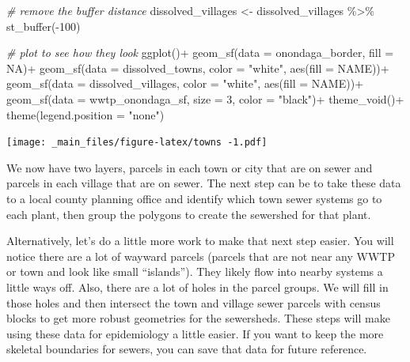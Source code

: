 \documentclass[
]{book}
\newenvironment{Shaded}{\begin{snugshade}}{\end{snugshade}}
\newcommand{\AttributeTok}[1]{\textcolor[rgb]{0.77,0.63,0.00}{#1}}
\newcommand{\CommentTok}[1]{\textcolor[rgb]{0.56,0.35,0.01}{\textit{#1}}}
\newcommand{\ConstantTok}[1]{\textcolor[rgb]{0.00,0.00,0.00}{#1}}
\newcommand{\DecValTok}[1]{\textcolor[rgb]{0.00,0.00,0.81}{#1}}
\newcommand{\FunctionTok}[1]{\textcolor[rgb]{0.00,0.00,0.00}{#1}}
\newcommand{\NormalTok}[1]{#1}
\newcommand{\OtherTok}[1]{\textcolor[rgb]{0.56,0.35,0.01}{#1}}
\newcommand{\SpecialCharTok}[1]{\textcolor[rgb]{0.00,0.00,0.00}{#1}}
\newcommand{\StringTok}[1]{\textcolor[rgb]{0.31,0.60,0.02}{#1}}
\begin{document}
\begin{Shaded}
\begin{Highlighting}[]
\CommentTok{\# remove the buffer distance}
\NormalTok{dissolved\_villages }\OtherTok{\textless{}{-}}\NormalTok{ dissolved\_villages }\SpecialCharTok{\%\textgreater{}\%}
  \FunctionTok{st\_buffer}\NormalTok{(}\SpecialCharTok{{-}}\DecValTok{100}\NormalTok{)}

\CommentTok{\# plot to see how they look}
\FunctionTok{ggplot}\NormalTok{()}\SpecialCharTok{+}
  \FunctionTok{geom\_sf}\NormalTok{(}\AttributeTok{data =}\NormalTok{ onondaga\_border, }\AttributeTok{fill =} \ConstantTok{NA}\NormalTok{)}\SpecialCharTok{+}
  \FunctionTok{geom\_sf}\NormalTok{(}\AttributeTok{data =}\NormalTok{ dissolved\_towns, }\AttributeTok{color =} \StringTok{"white"}\NormalTok{, }\FunctionTok{aes}\NormalTok{(}\AttributeTok{fill =} \StringTok{\textasciigrave{}}\AttributeTok{NAME}\StringTok{\textasciigrave{}}\NormalTok{))}\SpecialCharTok{+}
    \FunctionTok{geom\_sf}\NormalTok{(}\AttributeTok{data =}\NormalTok{ dissolved\_villages, }\AttributeTok{color =} \StringTok{"white"}\NormalTok{, }\FunctionTok{aes}\NormalTok{(}\AttributeTok{fill =} \StringTok{\textasciigrave{}}\AttributeTok{NAME}\StringTok{\textasciigrave{}}\NormalTok{))}\SpecialCharTok{+}
  \FunctionTok{geom\_sf}\NormalTok{(}\AttributeTok{data =}\NormalTok{ wwtp\_onondaga\_sf, }\AttributeTok{size =} \DecValTok{3}\NormalTok{, }\AttributeTok{color =} \StringTok{"black"}\NormalTok{)}\SpecialCharTok{+}
  \FunctionTok{theme\_void}\NormalTok{()}\SpecialCharTok{+}
  \FunctionTok{theme}\NormalTok{(}\AttributeTok{legend.position =} \StringTok{"none"}\NormalTok{)}
\end{Highlighting}
\end{Shaded}

\texttt{[image: \_main\_files/figure-latex/towns -1.pdf]}

We now have two layers, parcels in each town or city that are on sewer and parcels in each village that are on sewer. The next step can be to take these data to a local county planning office and identify which town sewer systems go to each plant, then group the polygons to create the sewershed for that plant.

Alternatively, let's do a little more work to make that next step easier. You will notice there are a lot of wayward parcels (parcels that are not near any WWTP or town and look like small ``islands''). They likely flow into nearby systems a little ways off. Also, there are a lot of holes in the parcel groups. We will fill in those holes and then intersect the town and village sewer parcels with census blocks to get more robust geometries for the sewersheds. These steps will make using these data for epidemiology a little easier. If you want to keep the more skeletal boundaries for sewers, you can save that data for future reference.
\end{document}
